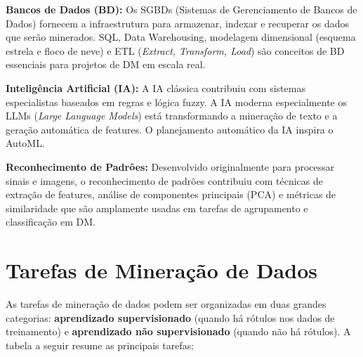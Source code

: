 \documentclass[12pt,a4paper]{article}
\begin{document}
\textbf{Bancos de Dados (BD):} Os SGBDs (Sistemas de Gerenciamento de Bancos de Dados) fornecem a infraestrutura para armazenar, indexar e recuperar os dados que serão minerados. SQL, Data Warehousing, modelagem dimensional (esquema estrela e floco de neve) e ETL (\textit{Extract, Transform, Load}) são conceitos de BD essenciais para projetos de DM em escala real.

\textbf{Inteligência Artificial (IA):} A IA clássica contribuiu com sistemas especialistas baseados em regras e lógica fuzzy. A IA moderna especialmente os LLMs (\textit{Large Language Models}) está transformando a mineração de texto e a geração automática de features. O planejamento automático da IA inspira o AutoML.

\textbf{Reconhecimento de Padrões:} Desenvolvido originalmente para processar sinais e imagens, o reconhecimento de padrões contribuiu com técnicas de extração de features, análise de componentes principais (PCA) e métricas de similaridade que são amplamente usadas em tarefas de agrupamento e classificação em DM.

\section{Tarefas de Mineração de Dados}

As tarefas de mineração de dados podem ser organizadas em duas grandes categorias: \textbf{aprendizado supervisionado} (quando há rótulos nos dados de treinamento) e \textbf{aprendizado não supervisionado} (quando não há rótulos). A tabela a seguir resume as principais tarefas:
\end{document}
